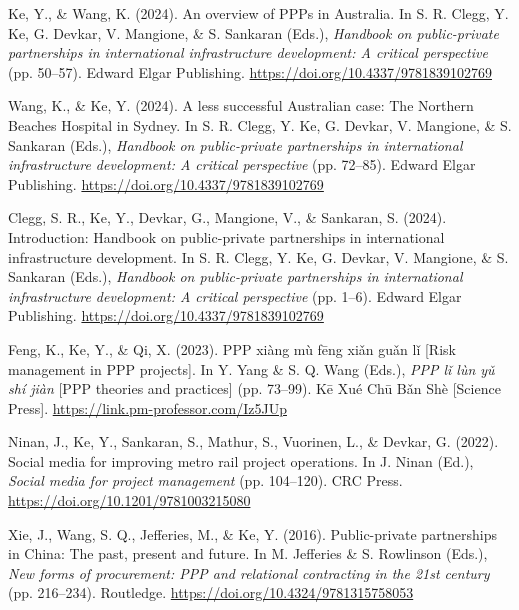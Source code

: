 \documentclass[11pt,a4paper]{report} %
\begin{document}
\begin{tablist}
        \item[2024] \tab{}Ke, Y., \& Wang, K. (2024). An overview of PPPs in Australia. In S. R. Clegg, Y. Ke, G. Devkar, V. Mangione, \& S. Sankaran (Eds.), \textit{Handbook on public-private partnerships in international infrastructure development: A critical perspective} (pp. 50--57). Edward Elgar Publishing. \href{https://doi.org/10.4337/9781839102769}{https://doi.org/10.4337/9781839102769}
        
        \item[2024] \tab{}Wang, K., \& Ke, Y. (2024). A less successful Australian case: The Northern Beaches Hospital in Sydney. In S. R. Clegg, Y. Ke, G. Devkar, V. Mangione, \& S. Sankaran (Eds.), \textit{Handbook on public-private partnerships in international infrastructure development: A critical perspective} (pp. 72--85). Edward Elgar Publishing. \href{https://doi.org/10.4337/9781839102769}{https://doi.org/10.4337/9781839102769}
        
        \item[2024] \tab{}Clegg, S. R., Ke, Y., Devkar, G., Mangione, V., \& Sankaran, S. (2024). Introduction: Handbook on public-private partnerships in international infrastructure development. In S. R. Clegg, Y. Ke, G. Devkar, V. Mangione, \& S. Sankaran (Eds.), \textit{Handbook on public-private partnerships in international infrastructure development: A critical perspective} (pp. 1--6). Edward Elgar Publishing. \href{https://doi.org/10.4337/9781839102769}{https://doi.org/10.4337/9781839102769}
        
        \item[2023] \tab{}Feng, K., Ke, Y., \& Qi, X. (2023). PPP xiàng mù fēng xiǎn guǎn lǐ [Risk management in PPP projects]. In Y. Yang \& S. Q. Wang (Eds.), \textit{PPP lǐ lùn yǔ shí jiàn} [PPP theories and practices] (pp. 73--99). Kē Xué Chū Bǎn Shè [Science Press]. \href{https://link.pm-professor.com/Iz5JUp}{https://link.pm-professor.com/Iz5JUp}
        
        \item[2022] \tab{}Ninan, J., Ke, Y., Sankaran, S., Mathur, S., Vuorinen, L., \& Devkar, G. (2022). Social media for improving metro rail project operations. In J. Ninan (Ed.), \textit{Social media for project management} (pp. 104--120). CRC Press. \href{https://doi.org/10.1201/9781003215080}{https://doi.org/10.1201/9781003215080}
        
        \item[2016] \tab{}Xie, J., Wang, S. Q., Jefferies, M., \& Ke, Y. (2016). Public-private partnerships in China: The past, present and future. In M. Jefferies \& S. Rowlinson (Eds.), \textit{New forms of procurement: PPP and relational contracting in the 21st century} (pp. 216--234). Routledge. \href{https://doi.org/10.4324/9781315758053}{https://doi.org/10.4324/9781315758053}
        

\end{tablist}
\end{document}
